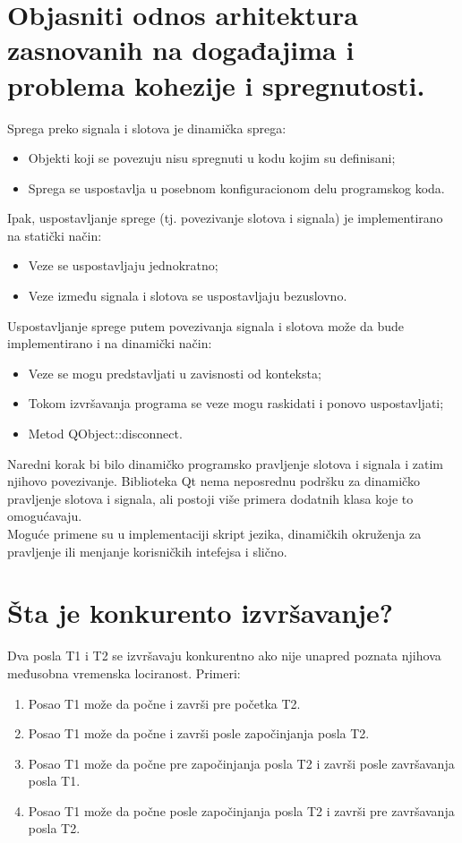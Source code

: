 \documentclass[a4paper]{article}
\begin{document}
\section{Objasniti odnos arhitektura zasnovanih na događajima i problema kohezije i spregnutosti.}
  \noindent Sprega preko signala i slotova je dinamička sprega:
  \begin{itemize}
    \item Objekti koji se povezuju nisu spregnuti u kodu kojim su definisani;
    \item Sprega se uspostavlja u posebnom konfiguracionom delu programskog koda.
  \end{itemize}
  Ipak, uspostavljanje sprege (tj. povezivanje slotova i signala) je implementirano na statički način:
  \begin{itemize}
    \item Veze se uspostavljaju jednokratno;
    \item Veze između signala i slotova se uspostavljaju bezuslovno.
  \end{itemize}
  Uspostavljanje sprege putem povezivanja signala i slotova može da bude implementirano 
  i na dinamički način:
  \begin{itemize}
    \item Veze se mogu predstavljati u zavisnosti od konteksta;
    \item Tokom izvršavanja programa se veze mogu raskidati i ponovo uspostavljati;
    \item Metod QObject::disconnect.
  \end{itemize}
  
  Naredni korak bi bilo dinamičko programsko pravljenje slotova i signala 
  i zatim njihovo povezivanje. Biblioteka Qt nema neposrednu podršku za dinamičko 
  pravljenje slotova i signala, ali postoji više primera dodatnih klasa koje to omogućavaju.\\
  \indent Moguće primene su u implementaciji skript jezika, dinamičkih okruženja za pravljenje ili 
  menjanje korisničkih intefejsa i slično.
  
\section{Šta je konkurento izvršavanje?}
  Dva posla T1 i T2 se izvršavaju konkurentno ako nije unapred poznata njihova međusobna 
  vremenska lociranost. Primeri:
  \begin{enumerate}
    \item Posao T1 može da počne i završi pre početka T2.
    \item Posao T1 može da počne i završi posle započinjanja posla T2.
    \item Posao T1 može da počne pre započinjanja posla T2 i završi posle završavanja posla T1.
    \item Posao T1 može da počne posle započinjanja posla T2 i završi pre završavanja posla T2.
  \end{enumerate}
  
\end{document}
